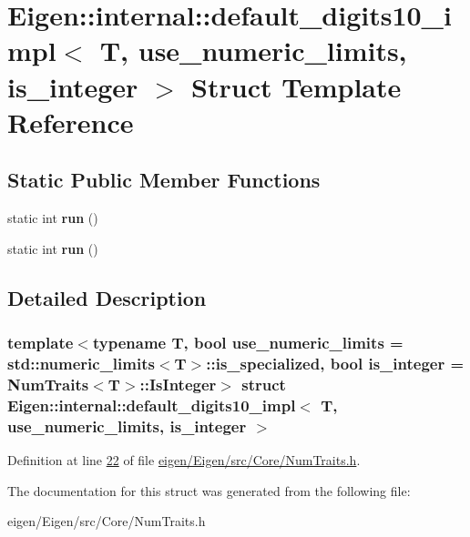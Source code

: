 \hypertarget{struct_eigen_1_1internal_1_1default__digits10__impl}{}\section{Eigen\+:\+:internal\+:\+:default\+\_\+digits10\+\_\+impl$<$ T, use\+\_\+numeric\+\_\+limits, is\+\_\+integer $>$ Struct Template Reference}
\label{struct_eigen_1_1internal_1_1default__digits10__impl}
\subsection*{Static Public Member Functions}
\begin{DoxyCompactItemize}
\item 
\mbox{\label{struct_eigen_1_1internal_1_1default__digits10__impl_a9c5d25b308ff287fca844827847208df}} 
static int {\bfseries run} ()
\item 
\mbox{\label{struct_eigen_1_1internal_1_1default__digits10__impl_a9c5d25b308ff287fca844827847208df}} 
static int {\bfseries run} ()
\end{DoxyCompactItemize}


\subsection{Detailed Description}
\subsubsection*{template$<$typename T, bool use\+\_\+numeric\+\_\+limits = std\+::numeric\+\_\+limits$<$\+T$>$\+::is\+\_\+specialized, bool is\+\_\+integer = Num\+Traits$<$\+T$>$\+::\+Is\+Integer$>$\newline
struct Eigen\+::internal\+::default\+\_\+digits10\+\_\+impl$<$ T, use\+\_\+numeric\+\_\+limits, is\+\_\+integer $>$}



Definition at line \hyperlink{eigen_2_eigen_2src_2_core_2_num_traits_8h_source_l00022}{22} of file \hyperlink{eigen_2_eigen_2src_2_core_2_num_traits_8h_source}{eigen/\+Eigen/src/\+Core/\+Num\+Traits.\+h}.



The documentation for this struct was generated from the following file\+:\begin{DoxyCompactItemize}
\item 
eigen/\+Eigen/src/\+Core/\+Num\+Traits.\+h\end{DoxyCompactItemize}
